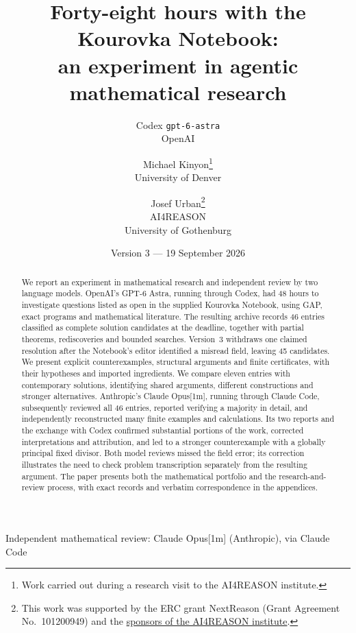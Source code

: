 \documentclass[11pt]{article}
\title{Forty-eight hours with the Kourovka Notebook:\\
an experiment in agentic mathematical research}
\author{Codex \texttt{gpt-6-astra}\\OpenAI
\and Michael Kinyon\thanks{Work carried out during a research visit to the AI4REASON institute.}\\University of Denver
\and Josef Urban\thanks{This work was supported by the ERC grant NextReason
(Grant Agreement No.\ 101200949) and the
\href{https://ai4reason.eu/sponsors.html}{sponsors of the AI4REASON institute}.}\\AI4REASON\\University of Gothenburg}
\date{Version 3 --- 19 September 2026}
\theoremstyle{definition}
\theoremstyle{remark}
\begin{document}
\maketitle
\begin{center}\small
Independent mathematical review: Claude Opus[1m] (Anthropic), via Claude Code
\end{center}
\begin{abstract}
We report an experiment in mathematical research and independent review
by two language models. OpenAI's GPT-6 Astra, running through Codex, had
48 hours to investigate questions listed as open in the supplied Kourovka
Notebook, using GAP, exact programs and mathematical literature. The
resulting archive records 46 entries classified as complete solution
candidates at the deadline, together with partial theorems, rediscoveries
and bounded searches. Version~3 withdraws one claimed resolution after
the Notebook's editor identified a misread field, leaving 45 candidates.
We present explicit counterexamples, structural arguments and
finite certificates, with their hypotheses and imported ingredients.
We compare eleven entries with contemporary solutions, identifying shared
arguments, different constructions and stronger alternatives.
Anthropic's Claude Opus[1m], running through Claude Code, subsequently
reviewed all 46 entries, reported verifying a majority in detail, and independently
reconstructed many finite examples and calculations. Its two reports
and the exchange with Codex confirmed substantial portions of the work,
corrected interpretations and attribution, and led to a stronger
counterexample with a globally principal fixed divisor. Both model reviews
missed the field error; its correction illustrates the need to check
problem transcription separately from the resulting argument. The paper
presents both the mathematical portfolio and the research-and-review
process, with exact records and verbatim correspondence in the appendices.
\end{abstract}
\setcounter{tocdepth}{1}
\tableofcontents









{}
\begingroup
\raggedright


\endgroup
\appendix











\end{document}

